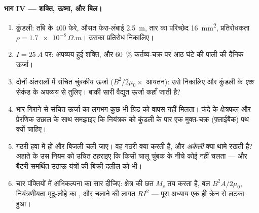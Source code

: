 \begin{problem}
\medskip\noindent\textbf{भाग IV --- शक्ति, ऊष्मा, और बिल।}

\begin{enumerate}[resume]
  \item कुंडली: ताँबे के 400 फेरे, औसत फेरा-लंबाई
        \qty{2.5}{m}, तार का परिच्छेद \qty{16}{mm^2}, प्रतिरोधकता
        $\rho = \qty{1.7e-8}{\Omega.m}$। उसका प्रतिरोध निकालिए।
  \item $I = \qty{25}{A}$ पर: अपव्यय हुई शक्ति, और \qty{60}{\percent}
        कर्तव्य-चक्र पर आठ घंटे की पाली की दैनिक ऊर्जा।
  \item दोनों अंतरालों में संचित चुंबकीय ऊर्जा
        ($B^2/2\mu_0 \times$ आयतन): उसे निकालिए और कुंडली के
        \emph{एक} सेकंड के अपव्यय से तुलिए। बाकी सारी वैद्युत ऊर्जा
        कहाँ जाती है?
  \item भार गिराने से संचित ऊर्जा का लगभग कुछ भी ग्रिड को वापस
        नहीं मिलता। फंदे के क्षेत्रफल और प्रेरणिक उछाल के साथ
        समझाइए कि नियंत्रक को कुंडली के पार एक मुक्त-चक्र
        (फ़्लाईबैक) पथ क्यों चाहिए।
  \item गठरी हवा में हो और बिजली चली जाए। वह गठरी क्या करती है, और
        \emph{अकेली}  क्या थामे रखती है? अहाते के उस नियम को
        उचित ठहराइए कि किसी चालू चुंबक के नीचे कोई नहीं चलता ---
        और बैटरी-समर्थित उठाऊ यंत्रों की बिक्री-दलील को भी।
  \item चार पंक्तियों में अभिकल्पना का सार दीजिए: क्षेत्र की छत
        $M_{\text{s}}$ तय करता है, बल $B^2A/2\mu_0$, नियंत्रणीयता
        मृदु-लोहे का , और चलाने की लागत $RI^2$ --- पूरा
        अध्याय एक ही क्रेन से लटका हुआ।
\end{enumerate}
\end{problem}

